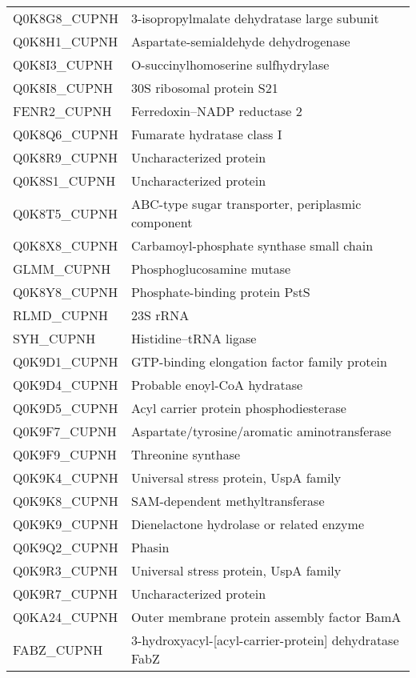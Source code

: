 \begin{center}
\begin{longtable}{ l l }
Q0K8G8\_CUPNH & 3-isopropylmalate dehydratase large subunit \\ [0.5ex]
Q0K8H1\_CUPNH & Aspartate-semialdehyde dehydrogenase \\ [0.5ex]
Q0K8I3\_CUPNH & O-succinylhomoserine sulfhydrylase \\ [0.5ex]
Q0K8I8\_CUPNH & 30S ribosomal protein S21 \\ [0.5ex]
FENR2\_CUPNH & Ferredoxin--NADP reductase 2 \\ [0.5ex]
Q0K8Q6\_CUPNH & Fumarate hydratase class I \\ [0.5ex]
Q0K8R9\_CUPNH & Uncharacterized protein \\ [0.5ex]
Q0K8S1\_CUPNH & Uncharacterized protein \\ [0.5ex]
Q0K8T5\_CUPNH & ABC-type sugar transporter, periplasmic component \\ [0.5ex]
Q0K8X8\_CUPNH & Carbamoyl-phosphate synthase small chain \\ [0.5ex]
GLMM\_CUPNH & Phosphoglucosamine mutase \\ [0.5ex]
Q0K8Y8\_CUPNH & Phosphate-binding protein PstS \\ [0.5ex]
RLMD\_CUPNH & 23S rRNA \\ [0.5ex]
SYH\_CUPNH & Histidine--tRNA ligase \\ [0.5ex]
Q0K9D1\_CUPNH & GTP-binding elongation factor family protein \\ [0.5ex]
Q0K9D4\_CUPNH & Probable enoyl-CoA hydratase \\ [0.5ex]
Q0K9D5\_CUPNH & Acyl carrier protein phosphodiesterase \\ [0.5ex]
Q0K9F7\_CUPNH & Aspartate/tyrosine/aromatic aminotransferase \\ [0.5ex]
Q0K9F9\_CUPNH & Threonine synthase \\ [0.5ex]
Q0K9K4\_CUPNH & Universal stress protein, UspA family \\ [0.5ex]
Q0K9K8\_CUPNH & SAM-dependent methyltransferase \\ [0.5ex]
Q0K9K9\_CUPNH & Dienelactone hydrolase or related enzyme \\ [0.5ex]
Q0K9Q2\_CUPNH & Phasin \\ [0.5ex]
Q0K9R3\_CUPNH & Universal stress protein, UspA family \\ [0.5ex]
Q0K9R7\_CUPNH & Uncharacterized protein \\ [0.5ex]
Q0KA24\_CUPNH & Outer membrane protein assembly factor BamA \\ [0.5ex]
FABZ\_CUPNH & 3-hydroxyacyl-[acyl-carrier-protein] dehydratase FabZ \\ [0.5ex]

\end{longtable}
\end{center}
